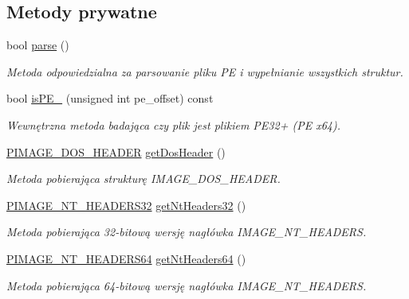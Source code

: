 \subsection*{Metody prywatne}
\begin{DoxyCompactItemize}
\item 
bool \hyperlink{class_p_e_file_a5cad3b303c988a59e0df69eeea762638}{parse} ()
\begin{DoxyCompactList}\small\item\em Metoda odpowiedzialna za parsowanie pliku P\-E i wypełnianie wszystkich struktur. \end{DoxyCompactList}\item 
bool \hyperlink{class_p_e_file_aa415803ce1fbb7e807e568ce25121515}{is\-P\-E\-\_} (unsigned int pe\-\_\-offset) const 
\begin{DoxyCompactList}\small\item\em Wewnętrzna metoda badająca czy plik jest plikiem P\-E32+ (P\-E x64). \end{DoxyCompactList}\item 
\hyperlink{winheader_8h_aaed631503b058e37835ef1446a928d5f}{P\-I\-M\-A\-G\-E\-\_\-\-D\-O\-S\-\_\-\-H\-E\-A\-D\-E\-R} \hyperlink{class_p_e_file_a9b129e61566361c90db87a6dcbadd05c}{get\-Dos\-Header} ()
\begin{DoxyCompactList}\small\item\em Metoda pobierająca strukturę I\-M\-A\-G\-E\-\_\-\-D\-O\-S\-\_\-\-H\-E\-A\-D\-E\-R. \end{DoxyCompactList}\item 
\hyperlink{winheader_8h_af5abf38c0a38de08149b1c0f7ec4a77f}{P\-I\-M\-A\-G\-E\-\_\-\-N\-T\-\_\-\-H\-E\-A\-D\-E\-R\-S32} \hyperlink{class_p_e_file_a05a8546f2cfbfb50d1fe6c750704f5ac}{get\-Nt\-Headers32} ()
\begin{DoxyCompactList}\small\item\em Metoda pobierająca 32-\/bitową wersję nagłówka I\-M\-A\-G\-E\-\_\-\-N\-T\-\_\-\-H\-E\-A\-D\-E\-R\-S. \end{DoxyCompactList}\item 
\hyperlink{winheader_8h_a9f6c372da5d74274df064a820641b9af}{P\-I\-M\-A\-G\-E\-\_\-\-N\-T\-\_\-\-H\-E\-A\-D\-E\-R\-S64} \hyperlink{class_p_e_file_a8c27cf9069fcfd79fab620e7a734a93d}{get\-Nt\-Headers64} ()
\begin{DoxyCompactList}\small\item\em Metoda pobierająca 64-\/bitową wersję nagłówka I\-M\-A\-G\-E\-\_\-\-N\-T\-\_\-\-H\-E\-A\-D\-E\-R\-S. \end{DoxyCompactList}\item 

\end{DoxyCompactItemize}
